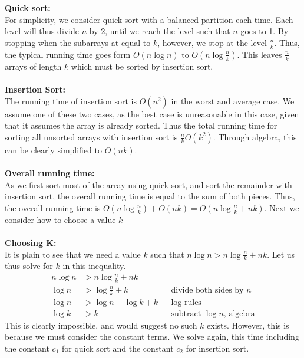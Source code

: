 \documentclass{article}
\begin{document}
\begin{enumerate}
	\\ \\ \textbf{Quick sort:}
	\\ For simplicity, we consider quick sort with a balanced partition each time. Each level will thus divide $n$ by 2, until we reach the level such that $n$ goes to 1. By stopping when the subarrays at equal to $k$, however, we stop at the level $\frac{n}{k}$. Thus, the typical running time goes form $O(n\log n)$ to $O(n\log \frac{n}{k})$. This leaves $\frac{n}{k}$ arrays of length $k$ which must be sorted by insertion sort.
	\\ \\ \textbf{Insertion Sort:}
	\\ The running time of insertion sort is $O(n^2)$ in the worst and average case. We assume one of these two cases, as the best case is unreasonable in this case, given that it assumes the array is already sorted. Thus the total running time for sorting all unsorted arrays with insertion sort is $\frac{n}{k}O(k^2)$. Through algebra, this can be clearly simplified to $O(nk)$.
	\\ \\ \textbf{Overall running time:}
	\\ As we first sort most of the array using quick sort, and sort the remainder with insertion sort, the overall running time is equal to the sum of both pieces. Thus, the overall running time is $O(n\log \frac{n}{k}) + O(nk)= O(n\log \frac{n}{k} + nk)$. Next we consider how to choose a value $k$
	\\ \\ \textbf{Choosing K:}
	\\ It is plain to see that we need a value $k$ such that $ n\log n > n\log \frac{n}{k} + nk$. Let us thus solve for $k$ in this inequality.
	\begin{align}
	n \log n &> n \log \frac{n}{k} + nk  && \text{} \\
	\log n &> \log \frac{n}{k} + k && \text{divide both sides by $n$} \\
	\log n &> \log n - \log k + k && \text{log rules} \\
	\log k &> k && \text{subtract $\log n$, algebra}
	\end{align}
	This is clearly impossible, and would suggest no such $k$ exists. However, this is because we must consider the constant terms. We solve again, this time including the constant $c_1$ for quick sort and the constant $c_2$ for insertion sort.
		\begin{align}

\end{align}
\end{enumerate}
\end{document}
